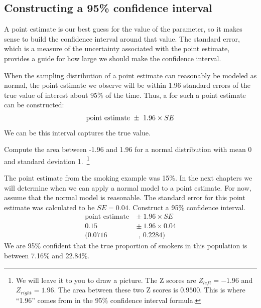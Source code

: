 \subsection{Constructing a 95\% confidence interval}

A point estimate is our best guess for the value of the parameter, so it makes sense to build the confidence interval around that value. The standard error, which is a measure of the uncertainty associated with the point estimate, provides a guide for how large we should make the confidence interval.

\begin{termBox}{
When the sampling distribution of a point estimate can reasonably be modeled as normal, the point estimate we observe will be within 1.96 standard errors of the true value of interest about 95\% of the time. Thus, a  for such a point estimate can be constructed:\vspace{-2mm}
\begin{align}
\text{point estimate}\ \pm\ 1.96 \times SE\vspace{-2mm}
\label{95PercentConfidenceIntervalFormula}
\end{align}
We can be  this interval captures the true value.}
\end{termBox}

\begin{exercise}
Compute the area between -1.96 and 1.96 for a normal distribution with mean 0 and standard deviation 1.~\footnote{We will leave it to you to draw a picture. The Z scores are $Z_{left} = -1.96$ and $Z_{right} = 1.96$. The area between these two Z scores is $0.9500$. This is where ``1.96'' comes from in the 95\% confidence interval formula.}
\end{exercise}

\begin{example}{The point estimate from the smoking example was 15\%. In the next chapters we will determine when we can apply a normal model to a point estimate. For now, assume that the normal model is reasonable. The standard error for this point estimate was calculated to be $SE = 0.04$. Construct a 95\% confidence interval.}
\begin{align*}
\text{point estimate}\ &\pm \ 1.96\times SE \\
0.15\  &\pm \ 1.96\times 0.04\\
(0.0716&\text{ , } 0.2284)
\end{align*}
We are 95\% confident that the true proportion of smokers in this population is between 7.16\% and 22.84\%.
\end{example}

